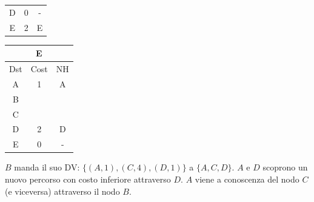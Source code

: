 \documentclass[10pt]{article}
\begin{document}
\begin{table}[h!]
\begin{tabular}{|c||c||c|}
					D & 0 & - \\
					E & 2 & E \\
					\hline
				\end{tabular}
				\begin{tabular}{|c||c||c|}
					\hline
					\multicolumn{3}{|c|}{E} \\
					\hline
					Dst & Cost & NH \\
					\hline
					A & 1 & A \\
					B &   &   \\
					C &   &   \\
					D & 2 & D \\
					E & 0 & - \\
					\hline
				\end{tabular}
			\end{table}
			\newline \newline \newline
			$B$ manda il suo DV: $\{(A,1),(C,4),(D,1)\}$ a $\{A,C,D\}$.
			\newline
			$A$ e $D$ scoprono un nuovo percorso con costo inferiore attraverso $D$.
			\newline
			$A$ viene a conoscenza del nodo $C$ (e viceversa) attraverso il nodo $B$.
\end{document}

